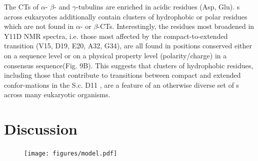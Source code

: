 The CTs of $\alpha$- $\beta$- and $\gamma$-tubulins are enriched in acidic residues (Asp, Glu). \gct{} s across eukaryotes additionally contain clusters of hydrophobic or polar residues which are not found in $\alpha$- or $\beta$-CTs. Interestingly, the residues most broadened in Y11D NMR spectra, i.e. those most affected by the compact-to-extended transition (V15, D19, E20, A32, G34), are all found in positions conserved either on a sequence level or on a physical property level (polarity/charge) in a consensus \gct{} sequence(Fig. 9B). This suggests that clusters of hydrophobic residues, including those that contribute to transitions between compact and extended confor-mations in the S.c. D11 \gct{}, are a feature of an otherwise diverse set of \gct{} s across many eukaryotic organisms.  

\begin{figure}
\centering     %
{}
\end{figure}

\section{Discussion}



\begin{figure}
\centering
\texttt{[image: figures/model.pdf]}
\end{figure}